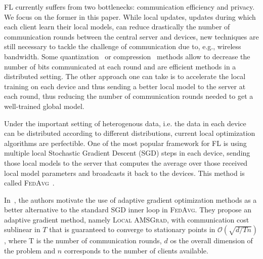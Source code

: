 \documentclass{article}
\begin{document}
FL currently suffers from two bottlenecks: communication efficiency and privacy.
We focus on the former in this paper.
While local updates, updates during which each client learn their local models, can reduce drastically the number of communication rounds between the central server and devices, new techniques are still necessary to tackle the  challenge of communication due to, e.g., wireless bandwidth.
Some quantization~\citep{alistarh2017qsgd, wangni2018gradient} or compression~\citep{lin2017deep} methods allow to decrease the number of bits communicated at each round and are efficient methods in a distributed setting.
The other approach one can take is to accelerate the local training on each device and thus sending a better local model to the server at each round, thus reducing the number of communication rounds needed to get a well-trained global model.

Under the important setting of heterogenous data, i.e. the data in each device can be distributed according to different distributions, current local optimization algorithms are perfectible.
One of the most popular framework for FL is using multiple local Stochastic Gradient Descent (\textsc{SGD}) steps in each device, sending those local models to the server that computes the average over those received local model parameters and broadcasts it back to the devices. This method is called \textsc{FedAvg}~\citep{mcmahan2017communication}.

In~\citet{chen2020toward}, the authors motivate the use of adaptive gradient optimization methods as a better alternative to the standard \textsc{SGD} inner loop in \textsc{FedAvg}.
They propose an adaptive gradient method, namely \textsc{Local AMSGrad}, with communication cost sublinear in $T$ that is guaranteed to converge to stationary points in $\mathcal{O}(\sqrt{d/Tn})$, where T is the number of communication rounds, $d$ os the overall dimension of the problem and $n$ corresponds to the number of clients available.
\end{document}
